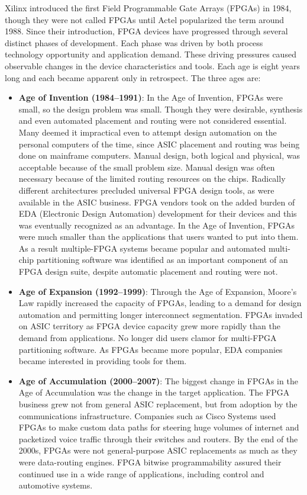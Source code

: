 \noindent Xilinx introduced the first Field Programmable Gate Arrays
(FPGAs) in 1984, though they were not called FPGAs until
Actel popularized the term around 1988\cite{fpga2}. Since their introduction, FPGA devices have progressed
through several distinct phases of development.
Each phase was driven by both process technology opportunity
and application demand. These driving pressures
caused observable changes in the device characteristics
and tools. Each age is eight years long and each
became apparent only in retrospect. The three ages are:
\begin{itemize}
	\item \textbf{Age of Invention (1984–1991)}:
	In the Age of Invention, FPGAs were small, so the design problem was small. Though they were desirable, synthesis
	and even automated placement and routing were not considered essential. Many deemed it impractical even to
	attempt design automation on the personal computers of the time, since ASIC placement and routing was being
	done on mainframe computers.
	Manual design, both
	logical and physical, was acceptable because of the small problem size. Manual design was often necessary because
	of the limited routing resources on the chips.
	Radically different architectures precluded universal FPGA design tools, as were available in the ASIC business.
	FPGA vendors took on the added burden of EDA (Electronic Design Automation) development for their devices and this was eventually recognized as an advantage.
	\newline
	In the Age of Invention, FPGAs were much smaller than the applications that users wanted to put into them. As a
	result multiple-FPGA systems became popular and automated multi-chip partitioning software was identified as
	an important component of an FPGA design suite, despite automatic placement and routing were not.
	\item \textbf{Age of Expansion (1992–1999)}:
	Through the Age of Expansion, Moore’s Law rapidly increased the capacity of FPGAs, leading to a demand for
	design automation and permitting longer interconnect segmentation.
	FPGAs invaded on ASIC territory as FPGA device capacity grew more rapidly than the
	demand from applications. No longer did users clamor for multi-FPGA partitioning software.
	As FPGAs became more popular, EDA companies became interested in providing tools for them.
	\item \textbf{Age of Accumulation (2000–2007)}:
	The biggest change in FPGAs in the Age of Accumulation was the change in the target application. The FPGA
	business grew not from general ASIC replacement, but from adoption by the communications infrastructure. Companies
	such as Cisco Systems used FPGAs to make custom data paths for steering huge volumes of internet and packetized
	voice traffic through their switches and routers.
	By the end of the 2000s, FPGAs were not general-purpose ASIC replacements as much as they were data-routing engines.
	FPGA bitwise programmability assured their continued use in a wide range of applications, including control and automotive systems.
\end{itemize}

